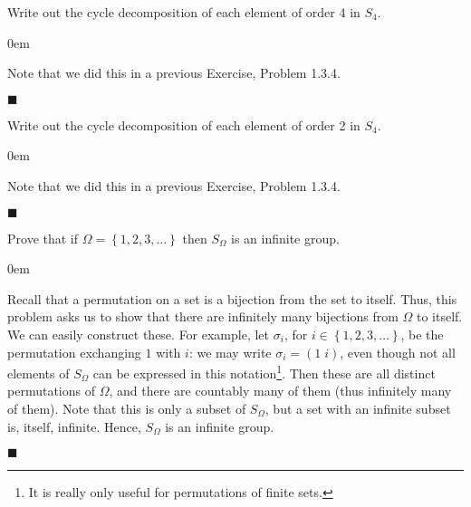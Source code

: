 \documentclass[12pt]{article}
\renewcommand{\qed}{\hfill$\blacksquare$}
\renewenvironment{proof}{\begin{addmargin}[1em]{0em}\begin{newproof}}{\end{newproof}\end{addmargin}\qed}
\newenvironment{problem}[2][Exercise]{\begin{trivlist}
\item[\hskip \labelsep {\bfseries #1}\hskip \labelsep {\bfseries #2.}]}{\end{trivlist}}
\begin{document}
\begin{problem}{1.3.6} Write out the cycle decomposition of each element of order 4 in $S_4$.
\end{problem}
\begin{proof}
Note that we did this in a previous Exercise, Problem 1.3.4.
\end{proof}


\begin{problem}{1.3.7} Write out the cycle decomposition of each element of order 2 in $S_4$.
\end{problem}
\begin{proof}
Note that we did this in a previous Exercise, Problem 1.3.4.
\end{proof}







\begin{problem}{1.3.8} Prove that if $\Omega = \left\{1,2,3,\ldots\right\}$ then $S_{\Omega}$ is an infinite group.
\end{problem}
\begin{proof}
Recall that a permutation on a set is a bijection from the set to itself. Thus, this problem asks us to show that there are infinitely many bijections from $\Omega$ to itself. We can easily construct these. For example, let $\sigma_i$, for $i\in \left\{1,2,3,\ldots\right\}$, be the permutation exchanging $1$ with $i$: we may write $\sigma_i=\left(1\; i\right)$, even though not all elements of $S_{\Omega}$ can be expressed in this notation\footnote{It is really only useful for permutations of finite sets.}.  Then these are all distinct permutations of $\Omega$, and there are countably many of them (thus infinitely many of them). Note that this is only a subset of $S_{\Omega}$, but a set with an infinite subset is, itself, infinite. Hence, $S_{\Omega}$ is an infinite group.
\end{proof}
\end{document}

